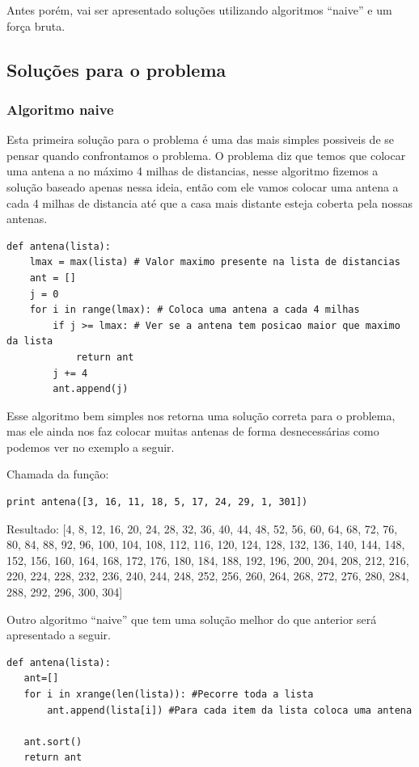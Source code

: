 \documentclass[11pt]{article}
\begin{document}
Antes porém, vai ser apresentado soluções utilizando algoritmos
``naive'' e um força bruta.


\subsection{Soluções para o problema}
\label{sec-5-3}
\label{sec-3}


\subsubsection{Algoritmo naive}
\label{sec-5-3-1}
\label{sec-3-1}

Esta primeira solução para o problema é uma das mais simples possiveis
de se pensar quando confrontamos o problema.  O problema diz que temos
que colocar uma antena a no máximo 4 milhas de distancias, nesse
algoritmo fizemos a solução baseado apenas nessa ideia, então com ele
vamos colocar uma antena a cada 4 milhas de distancia até que a casa
mais distante esteja coberta pela nossas antenas.

\begin{verbatim}
def antena(lista):
    lmax = max(lista) # Valor maximo presente na lista de distancias
    ant = []
    j = 0
    for i in range(lmax): # Coloca uma antena a cada 4 milhas
        if j >= lmax: # Ver se a antena tem posicao maior que maximo da lista
            return ant
        j += 4
        ant.append(j)
\end{verbatim}

Esse algoritmo bem simples nos retorna uma solução correta para o
problema, mas ele ainda nos faz colocar muitas antenas de forma
desnecessárias como podemos ver no exemplo a seguir.

Chamada da função:
\begin{verbatim}
print antena([3, 16, 11, 18, 5, 17, 24, 29, 1, 301])
\end{verbatim}

Resultado:
[4, 8, 12, 16, 20, 24, 28, 32, 36, 40, 44, 48, 52, 56, 60, 64, 68, 72, 76, 80, 84, 88, 92, 96, 100, 104, 108, 112, 116, 120, 124, 128, 132, 136, 140, 144, 148, 152, 156, 160, 164, 168, 172, 176, 180, 184, 188, 192, 196, 200, 204, 208, 212, 216, 220, 224, 228, 232, 236, 240, 244, 248, 252, 256, 260, 264, 268, 272, 276, 280, 284, 288, 292, 296, 300, 304]

Outro algoritmo ``naive'' que tem uma solução melhor do que anterior será apresentado a seguir.

\begin{verbatim}
def antena(lista):
   ant=[]
   for i in xrange(len(lista)): #Pecorre toda a lista
       ant.append(lista[i]) #Para cada item da lista coloca uma antena

   ant.sort()
   return ant
\end{verbatim}
\end{document}
